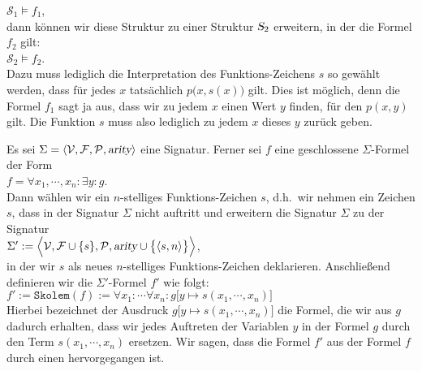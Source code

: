 \hspace*{1.3cm}
$\mathcal{S}_1 \models f_1$,
\\[0.2cm]
dann können wir diese Struktur zu einer Struktur $\textsl{S}_2$ erweitern, in der die
Formel $f_2$ gilt:
\\[0.2cm]
\hspace*{1.3cm}
$\mathcal{S}_2 \models f_2$.
\\[0.2cm]
Dazu muss lediglich die Interpretation des Funktions-Zeichens $s$ so gewählt werden, dass
für jedes $x$ tatsächlich $p\bigl(x,s(x)\bigr)$ gilt.  Dies ist möglich, denn die Formel $f_1$ sagt ja aus, 
dass wir zu jedem $x$ einen Wert $y$ finden, für den $p(x,y)$ gilt.   Die Funktion $s$ muss also lediglich zu 
jedem $x$ dieses $y$ zurück geben. 



\begin{Definition}
  Es sei $\Sigma = \langle \mathcal{V}, \mathcal{F}, \mathcal{P}, \textsl{arity} \rangle$
  eine Signatur.  Ferner sei $f$ eine geschlossene $\Sigma$-Formel der Form \\[0.2cm]
  \hspace*{1.3cm} 
  $f = \forall x_1, \cdots, x_n \colon \exists y \colon g$. \\[0.2cm]
  Dann wählen wir ein  $n$-stelliges Funktions-Zeichen $s$, d.h.~wir nehmen ein Zeichen $s$, dass in
  der Signatur $\Sigma$ nicht auftritt und erweitern die Signatur $\Sigma$ zu der Signatur \\[0.2cm]
  \hspace*{1.3cm} 
  $\Sigma' := \Bigl\langle \mathcal{V}, \mathcal{F} \cup \{s\}, \mathcal{P}, \textsl{arity} \cup \bigl\{\pair(s,n)\bigr\} \Bigr\rangle$, \\[0.2cm]
  in der wir $s$ als neues $n$-stelliges Funktions-Zeichen deklarieren.  Anschließend definieren wir die $\Sigma'$-Formel
  $f'$ wie folgt: \\[0.2cm]
  \hspace*{1.3cm} 
  $f' := \mathtt{Skolem}(f) := 
  \forall x_1 \colon \cdots \forall x_n \colon g\bigl[y \mapsto s(x_1,\cdots,x_n)\bigr]$
  \\[0.2cm]
  Hierbei bezeichnet der Ausdruck $g\bigl[y \mapsto s(x_1,\cdots,x_n)\bigr]$ die Formel, die wir aus $g$
  dadurch erhalten, dass wir jedes Auftreten der Variablen $y$ in der Formel $g$ durch den Term
  $s(x_1,\cdots,x_n)$ ersetzen.  Wir sagen, dass die Formel $f'$ aus der Formel $f$
  durch einen  hervorgegangen ist. 
  \eox
\end{Definition}


